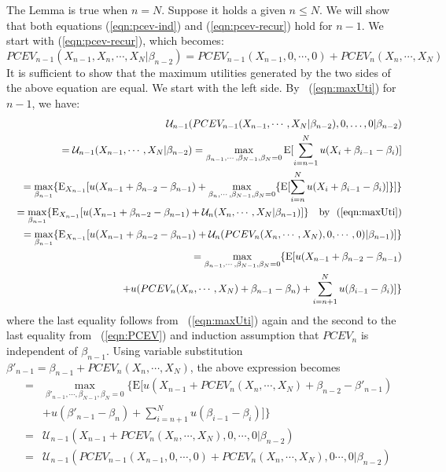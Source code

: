 \documentclass{article}[12pt letter]
\newcommand{\E}{\mathrm{E}}
\begin{document}
\proof The Lemma is true when $n=N$. Suppose it holds a given $n
\leq N$. We will show that both equations (\ref{eqn:pcev-ind}) and (\ref{eqn:pcev-recur}) hold for $n-1$. We start with (\ref{eqn:pcev-recur}), which becomes:
\[PCEV_{n-1}(X_{n-1},X_n, \cdots, X_N|\beta_{n-2}) = PCEV_{n-1}(X_{n-1},0,\cdots, 0) + PCEV_n(X_n, \cdots, X_N)\]
It is sufficient to show that the maximum utilities generated by the two sides of the above equation are equal. We start with the left side. By ~(\ref{eqn:maxUti}) for $n-1$, we have:
\begin{eqnarray*}
&&\mathcal{U}_{n-1}(PCEV_{n-1}(X_{n-1},\cdots,X_N|\beta_{n-2}),0,\dots,0 |\beta_{n-2})  \\&&= \mathcal{U}_{n-1}(X_{n-1},\cdots,X_N|\beta_{n-2}) = \max_{  \beta_{n-1}, \cdots, \beta_{N-1},\beta_N=0} \E[\sum_{i=n-1}^N u(X_i + \beta_{i-1}-\beta_i)] \\
&& = \max_{\beta_{n-1}} \{\E_{X_{n-1}}[ u(X_{n-1}+\beta_{n-2}-\beta_{n-1})+ \max_{\beta_{n}, \cdots,\beta_{N-1}, \beta_N=0 }\{ \E [\sum_{i=n}^N u(X_i + \beta_{i-1} - \beta_i)]\}]\} \\
&& = \max_{\beta_{n-1}} \{\E_{X_{n-1}}[ u(X_{n-1}+\beta_{n-2}-\beta_{n-1})+   \mathcal{U}_n(X_n,\cdots, X_N |\beta_{n-1}) ]\} \quad  \text{by ~(\ref{eqn:maxUti})}\\
&& =\max_{\beta_{n-1}} \{\E_{X_{n-1}}[ u(X_{n-1}+\beta_{n-2}-\beta_{n-1})+ \mathcal{U}_n(PCEV_n(X_n, \cdots, X_N),0,\cdots,0)|\beta_{n-1} )]\}\\
&&= \max_{\beta_{n-1}, \cdots,\beta_{N-1}, \beta_N=0 } \{\E[u(X_{n-1}+\beta_{n-2} - \beta_{n-1}) \\&& + u(PCEV_n(X_n, \cdots, X_N) + \beta_{n-1}-\beta_n) + \sum_{i=n+1}^N u( \beta_{i-1} - \beta_i)]\}
\end{eqnarray*}
where the last equality follows from ~(\ref{eqn:maxUti}) again and the second to the last equality from ~(\ref{eqn:PCEV}) and induction assumption that $PCEV_n$ is independent of $\beta_{n-1}$. Using variable substitution $\beta'_{n-1} = \beta_{n-1} + PCEV_n(X_n, \cdots, X_N)$,  the above expression becomes
\begin{eqnarray*}
&=& \max_{ \beta'_{n-1}, \cdots, \beta_{N-1},  \beta_N=0}\{ \E[u(X_{n-1}+ PCEV_{n}(X_n,\cdots,X_N) +\beta_{n-2}- \beta'_{n-1})\\
&&+ u(\beta'_{n-1}-\beta_n) + \sum_{i=n+1}^N u(\beta_{i-1}-\beta_i)] \} \\
&=& \mathcal{U}_{n-1}(X_{n-1}+PCEV_n(X_n,\cdots,X_N), 0, \cdots,0|\beta_{n-2}) \\
&=& \mathcal{U}_{n-1}(PCEV_{n-1}(X_{n-1},0,\cdots,0) + PCEV_n(X_n,\cdots,X_N) ,0\cdots,0|\beta_{n-2})
\end{eqnarray*}
\end{document}
